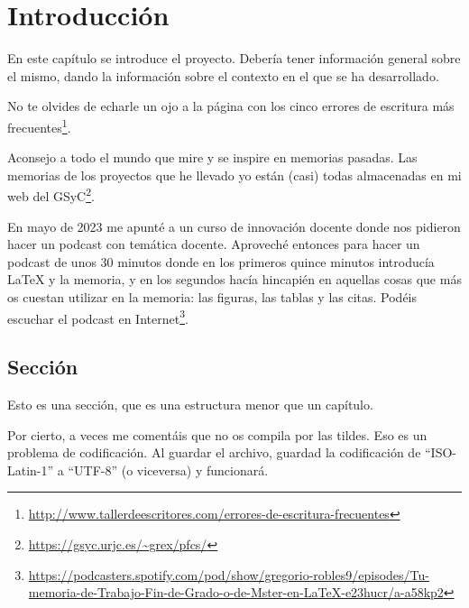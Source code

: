 
\cleardoublepage
\chapter{Introducción}
\label{sec:intro} %

En este capítulo se introduce el proyecto.
Debería tener información general sobre el mismo, dando la información sobre el contexto en el que se ha desarrollado.

No te olvides de echarle un ojo a la página con los cinco errores de escritura más frecuentes\footnote{\url{http://www.tallerdeescritores.com/errores-de-escritura-frecuentes}}.

Aconsejo a todo el mundo que mire y se inspire en memorias pasadas.
Las memorias de los proyectos que he llevado yo están (casi) todas almacenadas en mi web del GSyC\footnote{\url{https://gsyc.urjc.es/~grex/pfcs/}}.

En mayo de 2023 me apunté a un curso de innovación docente donde nos pidieron hacer un podcast con temática docente. Aproveché entonces para hacer un podcast de unos 30 minutos donde en los primeros quince minutos introducía LaTeX y la memoria, y en los segundos hacía hincapién en aquellas cosas que más os cuestan utilizar en la memoria: las figuras, las tablas y las citas. Podéis escuchar el podcast en Internet\footnote{\url{https://podcasters.spotify.com/pod/show/gregorio-robles9/episodes/Tu-memoria-de-Trabajo-Fin-de-Grado-o-de-Mster-en-LaTeX-e23hucr/a-a58kp2}}.


\section{Sección}
\label{sec:seccion}

Esto es una sección, que es una estructura menor que un capítulo. 

Por cierto, a veces me comentáis que no os compila por las tildes.
Eso es un problema de codificación.
Al guardar el archivo, guardad la codificación de ``ISO-Latin-1'' a ``UTF-8'' (o viceversa) y funcionará.

